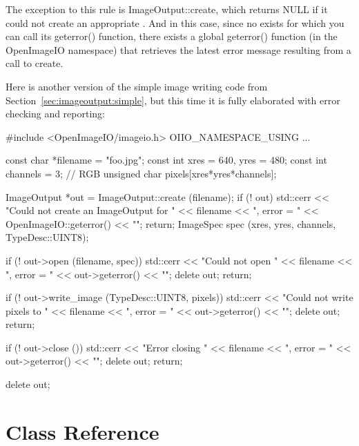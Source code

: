 The exception to this rule is {\cf ImageOutput::create}, which returns
{\cf NULL} if it could not create an appropriate \ImageOutput.  And in
this case, since no \ImageOutput exists for which you can call its {\cf
  geterror()} function, there exists a global {\cf geterror()}
function (in the {\cf OpenImageIO} namespace) that retrieves the latest
error message resulting from a call to {\cf create}.

Here is another version of the simple image writing code from
Section~\ref{sec:imageoutput:simple}, but this time it is fully 
elaborated with error checking and reporting:

\begin{code}
        #include <OpenImageIO/imageio.h>
        OIIO_NAMESPACE_USING
        ...

        const char *filename = "foo.jpg";
        const int xres = 640, yres = 480;
        const int channels = 3;  // RGB
        unsigned char pixels[xres*yres*channels];

        ImageOutput *out = ImageOutput::create (filename);
        if (! out) {
            std::cerr << "Could not create an ImageOutput for " 
                      << filename << ", error = " 
                      << OpenImageIO::geterror() << "\n";
            return;
        }
        ImageSpec spec (xres, yres, channels, TypeDesc::UINT8);

        if (! out->open (filename, spec)) {
            std::cerr << "Could not open " << filename 
                      << ", error = " << out->geterror() << "\n";
            delete out;
            return;
        }

        if (! out->write_image (TypeDesc::UINT8, pixels)) {
            std::cerr << "Could not write pixels to " << filename 
                      << ", error = " << out->geterror() << "\n";
            delete out;
            return;
        }

        if (! out->close ()) {
            std::cerr << "Error closing " << filename 
                      << ", error = " << out->geterror() << "\n";
            delete out;
            return;
        }

        delete out;
\end{code}



\section{\ImageOutput Class Reference}
\label{sec:imageoutput:reference}

